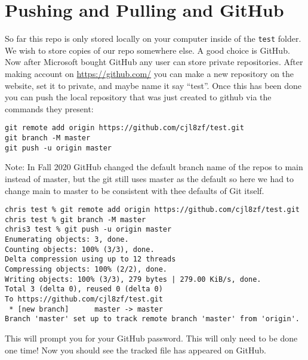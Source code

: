 \documentclass{article}
\begin{document}
\section{Pushing and Pulling and GitHub}
So far this repo is only stored locally on your computer inside of the
\lstinline{test} folder. We wish to store copies of our repo somewhere
else. A good choice is GitHub. Now after Microsoft bought GitHub any
user can store private repositories. After making account on
\href{https://github.com/}{https://github.com/} you can make a new
repository on the website, set it to private, and maybe name it say
``test''. Once this has been done you can push the local repository
that was just created to github via the commands they present:
\begin{lstlisting}
git remote add origin https://github.com/cjl8zf/test.git
git branch -M master
git push -u origin master
\end{lstlisting}
Note: In Fall 2020 GitHub changed the default branch name of the repos
to main instead of master, but the git still uses master as the
default so here we had to change main to master to be consistent with
thee defaults of Git itself.
\begin{lstlisting}
chris test % git remote add origin https://github.com/cjl8zf/test.git 
chris test % git branch -M master
chris3 test % git push -u origin master 
Enumerating objects: 3, done.
Counting objects: 100% (3/3), done.
Delta compression using up to 12 threads
Compressing objects: 100% (2/2), done.
Writing objects: 100% (3/3), 279 bytes | 279.00 KiB/s, done.
Total 3 (delta 0), reused 0 (delta 0)
To https://github.com/cjl8zf/test.git
 * [new branch]      master -> master
Branch 'master' set up to track remote branch 'master' from 'origin'.
\end{lstlisting}
This will prompt you for your GitHub password. This will only need to
be done one time! Now you should see the tracked file has appeared on GitHub.
\end{document}
